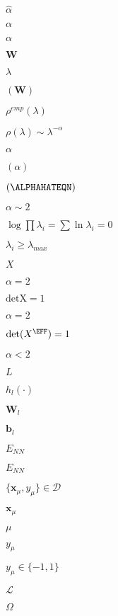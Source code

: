 

$\hat{\alpha}$

$\alpha$

$\alpha$




$\mathbf{W}$

$\lambda$

$(\mathbf{W})$

$\rho^{emp}(\lambda)$

$\rho(\lambda)\sim\lambda^{-\alpha}$

$\alpha$

$(\alpha)$

$(\ALPHAHATEQN)$



$\alpha \sim 2$

$\log\prod\lambda_{i}=\sum\ln\lambda_{i}=0$

$\lambda_{i}\ge\lambda_{max}$

$X$

$\alpha=2$

$\mbox{detX} =1$

$\alpha=2$

$\mbox{det}(X^{\EFF}) = 1$

$\alpha < 2$




$L$

$h_{l}(\cdot)$

$\mathbf{W}_{l}$

$\mathbf{b}_{l}$

$E_{NN}$

$E_{NN}$

$\{\mathbf{x}_{\mu},y_{\mu}\}\in\mathcal{D}$

$ \mathbf{x}_\mu $

$\mu$

$y_\mu$

$y_{\mu}\in\{-1,1\}$

$\mathcal{L}$

$\Omega$

